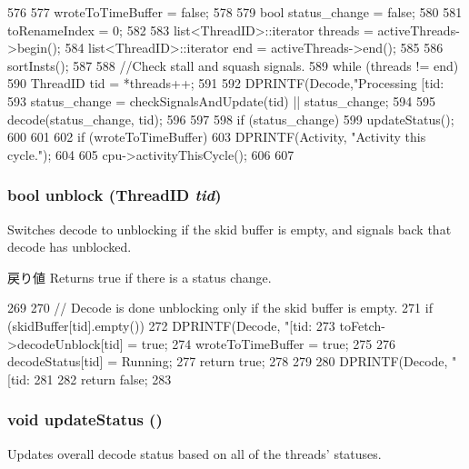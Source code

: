 \begin{DoxyCode}
576 {
577     wroteToTimeBuffer = false;
578 
579     bool status_change = false;
580 
581     toRenameIndex = 0;
582 
583     list<ThreadID>::iterator threads = activeThreads->begin();
584     list<ThreadID>::iterator end = activeThreads->end();
585 
586     sortInsts();
587 
588     //Check stall and squash signals.
589     while (threads != end) {
590         ThreadID tid = *threads++;
591 
592         DPRINTF(Decode,"Processing [tid:%
593         status_change =  checkSignalsAndUpdate(tid) || status_change;
594 
595         decode(status_change, tid);
596     }
597 
598     if (status_change) {
599         updateStatus();
600     }
601 
602     if (wroteToTimeBuffer) {
603         DPRINTF(Activity, "Activity this cycle.\n");
604 
605         cpu->activityThisCycle();
606     }
607 }
\end{DoxyCode}
\hypertarget{classDefaultDecode_a9cc3b95f6969935f78c0158aa5145021}{
\subsubsection[{unblock}]{\setlength{\rightskip}{0pt plus 5cm}bool unblock ({\bf ThreadID} {\em tid})}}
\label{classDefaultDecode_a9cc3b95f6969935f78c0158aa5145021}
Switches decode to unblocking if the skid buffer is empty, and signals back that decode has unblocked. \begin{DoxyReturn}{戻り値}
Returns true if there is a status change. 
\end{DoxyReturn}



\begin{DoxyCode}
269 {
270     // Decode is done unblocking only if the skid buffer is empty.
271     if (skidBuffer[tid].empty()) {
272         DPRINTF(Decode, "[tid:%
273         toFetch->decodeUnblock[tid] = true;
274         wroteToTimeBuffer = true;
275 
276         decodeStatus[tid] = Running;
277         return true;
278     }
279 
280     DPRINTF(Decode, "[tid:%
281 
282     return false;
283 }
\end{DoxyCode}
\hypertarget{classDefaultDecode_a4bb9486757ce225941aaaf759b357a57}{
\subsubsection[{updateStatus}]{\setlength{\rightskip}{0pt plus 5cm}void updateStatus ()}}
\label{classDefaultDecode_a4bb9486757ce225941aaaf759b357a57}
Updates overall decode status based on all of the threads' statuses. 


